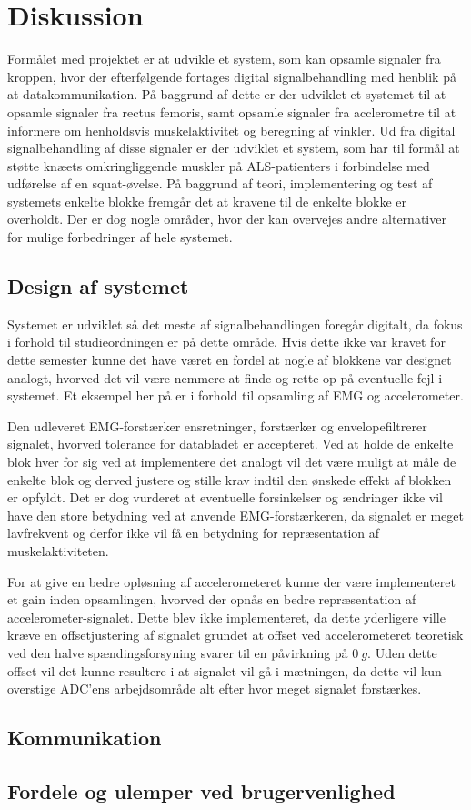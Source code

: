 \section{Diskussion}
Formålet med projektet er at udvikle et system, som kan opsamle signaler fra kroppen, hvor der efterfølgende fortages digital signalbehandling med henblik på at datakommunikation. På baggrund af dette er der udviklet et systemet til at opsamle signaler fra rectus femoris, samt opsamle signaler fra acclerometre til at informere om henholdsvis muskelaktivitet og beregning af vinkler. Ud fra digital signalbehandling af disse signaler er der udviklet et system, som har til formål at støtte knæets omkringliggende muskler på ALS-patienters i forbindelse med udførelse af en squat-øvelse. På baggrund af teori, implementering og test af systemets enkelte blokke fremgår det at kravene til de enkelte blokke er overholdt. Der er dog nogle områder, hvor der kan overvejes andre alternativer for mulige forbedringer af hele systemet. 

\subsection{Design af systemet}
Systemet er udviklet så det meste af signalbehandlingen foregår digitalt, da fokus i forhold til studieordningen er på dette område. Hvis dette ikke var kravet for dette semester kunne det have været en fordel at nogle af blokkene var designet analogt, hvorved det vil være nemmere at finde  og rette op på eventuelle fejl i systemet. Et eksempel her på er i forhold til opsamling af EMG og accelerometer. 

Den udleveret EMG-forstærker ensretninger, forstærker og envelopefiltrerer signalet, hvorved tolerance for databladet er accepteret. Ved at holde de enkelte blok hver for sig ved at implementere det analogt vil det være muligt at måle de enkelte blok og derved justere og stille krav indtil den ønskede effekt af blokken er opfyldt. Det er dog vurderet at eventuelle forsinkelser og ændringer ikke vil have den store betydning ved at anvende EMG-forstærkeren, da signalet er meget lavfrekvent og derfor ikke vil få en betydning for repræsentation af muskelaktiviteten. 

For at give en bedre opløsning af accelerometeret kunne der være implementeret et gain inden opsamlingen, hvorved der opnås en bedre repræsentation af accelerometer-signalet. Dette blev ikke implementeret, da dette yderligere ville kræve en offsetjustering af signalet grundet at offset ved accelerometeret teoretisk ved den halve spændingsforsyning svarer til en påvirkning på $0~g$. Uden dette offset vil det kunne resultere i at signalet vil gå i mætningen, da dette vil kun overstige ADC'ens arbejdsområde alt efter hvor meget signalet forstærkes. 

\subsection{Kommunikation}




\subsection{Fordele og ulemper ved brugervenlighed}

%
%
%
%
